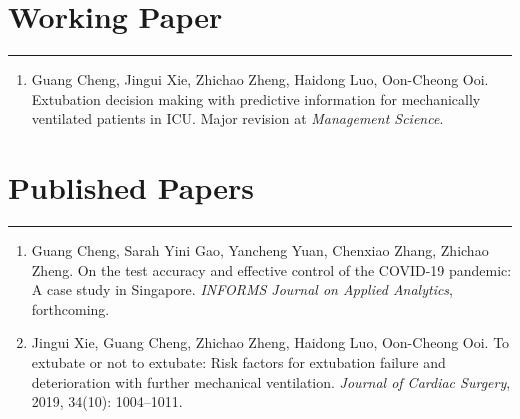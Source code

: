 \documentclass[12pt, a4paper]{article}
\begin{document}
{%

\section*{Working Paper}
\vspace*{0.4em}
\hrule height 0.5pt
\begin{enumerate}[leftmargin=36pt, itemsep=6pt, parsep=0.2pt, topsep=1pt]

	\item Guang Cheng, Jingui Xie, Zhichao Zheng, Haidong Luo, Oon-Cheong Ooi.
	Extubation decision making with predictive information for mechanically ventilated patients in ICU.
	Major revision at {\it Management Science}.

\end{enumerate}




\section*{Published Papers}
\vspace*{0.4em}
\hrule height 0.5pt
\begin{enumerate}[leftmargin=36pt, itemsep=6pt, parsep=0.2pt, topsep=1pt]

	\item Guang Cheng, Sarah Yini Gao, Yancheng Yuan, Chenxiao Zhang, Zhichao Zheng. 
	On the test accuracy and effective control of the COVID-19 pandemic: A case study in Singapore. 
	{\it INFORMS Journal on Applied Analytics}, forthcoming.

	\item Jingui Xie, Guang Cheng, Zhichao Zheng, Haidong Luo, Oon-Cheong Ooi. 
	To extubate or not to extubate: Risk factors for extubation failure and deterioration with further mechanical ventilation. 
	{\it Journal of Cardiac Surgery}, 2019, 34(10): 1004–1011. 

\end{enumerate}




}
\end{document}
